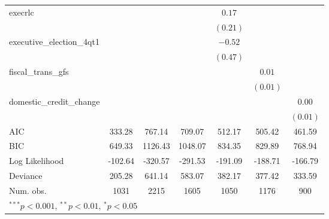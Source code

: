 \begin{tabular}{l c c c c c c }
execrlc                   &               &              &              & $0.17$      &               &            \\
                          &               &              &              & $(0.21)$    &               &            \\
executive\_election\_4qt1 &               &              &              & $-0.52$     &               &            \\
                          &               &              &              & $(0.47)$    &               &            \\
fiscal\_trans\_gfs        &               &              &              &             & $0.01$        &            \\
                          &               &              &              &             & $(0.01)$      &            \\
domestic\_credit\_change  &               &              &              &             &               & $0.00$     \\
                          &               &              &              &             &               & $(0.01)$   \\
\hline
AIC                       & 333.28        & 767.14       & 709.07       & 512.17      & 505.42        & 461.59     \\
BIC                       & 649.33        & 1126.43      & 1048.07      & 834.35      & 829.89        & 768.94     \\
Log Likelihood            & -102.64       & -320.57      & -291.53      & -191.09     & -188.71       & -166.79    \\
Deviance                  & 205.28        & 641.14       & 583.07       & 382.17      & 377.42        & 333.59     \\
Num. obs.                 & 1031          & 2215         & 1605         & 1050        & 1176          & 900        \\
\hline
\multicolumn{7}{l}{\scriptsize{$^{***}p<0.001$, $^{**}p<0.01$, $^*p<0.05$}}
\end{tabular}
